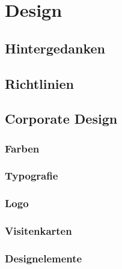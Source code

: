 \section{Design}
\subsection{Hintergedanken}
\subsection{Richtlinien}
\subsection{Corporate Design}
\subsubsection{Farben}
\subsubsection{Typografie}
\subsubsection{Logo}
\subsubsection{Visitenkarten}
\subsubsection{Designelemente}